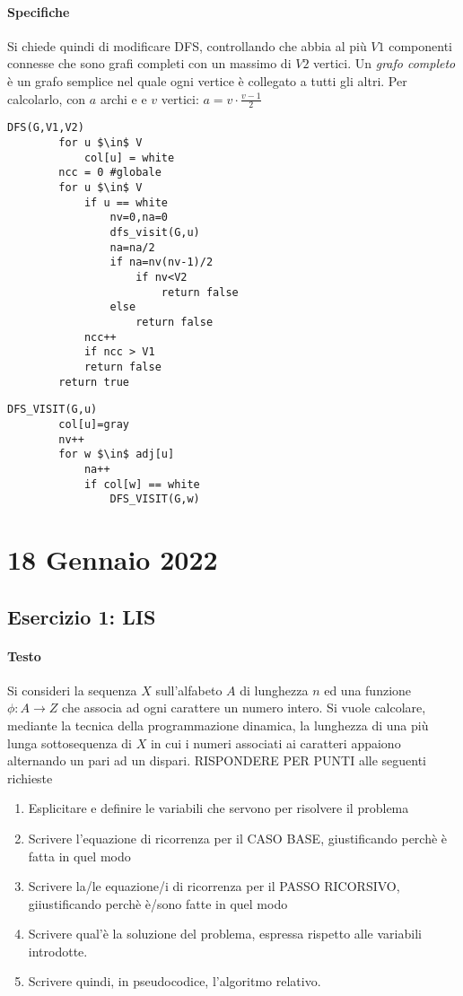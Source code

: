 \documentclass[12pt, a4paper, openany]{book}
\begin{document}
\paragraph*{Specifiche}
Si chiede quindi di modificare DFS, controllando che abbia al più $V1$ componenti connesse che sono grafi completi con un massimo di $V2$ vertici.
Un \emph{grafo completo} è un grafo semplice nel quale ogni vertice è collegato a tutti gli altri. Per calcolarlo, con $a$ archi e e $v$ vertici: $a = v\cdot \frac{v-1}{2}$

\begin{lstlisting}[style=small]
	DFS(G,V1,V2)
		for u $\in$ V
			col[u] = white
		ncc = 0 #globale
		for u $\in$ V
			if u == white
				nv=0,na=0
				dfs_visit(G,u)
				na=na/2
				if na=nv(nv-1)/2
					if nv<V2
						return false
				else 
					return false
			ncc++
			if ncc > V1
			return false
		return true
\end{lstlisting}

\begin{lstlisting}[style = small]
	DFS_VISIT(G,u)
		col[u]=gray
		nv++
		for w $\in$ adj[u]
			na++
			if col[w] == white
				DFS_VISIT(G,w)
\end{lstlisting}

\section{18 Gennaio 2022}
\subsection{Esercizio 1: LIS}
\paragraph*{Testo}
Si consideri la sequenza $X$ sull'alfabeto $A$ di lunghezza $n$ ed una funzione $\phi:A\to Z$ che associa ad ogni carattere un numero intero.
Si vuole calcolare, mediante la tecnica della programmazione dinamica, la lunghezza di una più lunga sottosequenza di $X$ in cui i numeri associati ai caratteri appaiono alternando un pari ad un dispari.
RISPONDERE PER PUNTI alle seguenti richieste
\begin{enumerate}
	\item Esplicitare e definire le variabili che servono per risolvere il problema
	\item Scrivere l'equazione di ricorrenza per il CASO BASE, giustificando perchè è fatta in quel modo
	\item Scrivere la/le equazione/i di ricorrenza per il PASSO RICORSIVO, giiustificando perchè è/sono fatte in quel modo
	\item Scrivere qual'è la soluzione del problema, espressa rispetto alle variabili introdotte.
	\item Scrivere quindi, in pseudocodice, l'algoritmo relativo.
\end{enumerate}
\end{document}
